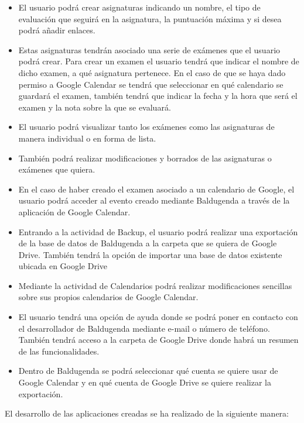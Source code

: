 \begin{itemize}
	\item El usuario podrá crear asignaturas indicando un nombre, el tipo de evaluación que seguirá en la asignatura, la puntuación máxima  y si desea podrá añadir enlaces.
	\item Estas asignaturas tendrán asociado una serie de exámenes que el usuario podrá crear. Para crear un examen el usuario tendrá que indicar el nombre de dicho examen, a qué asignatura pertenece. En el caso de que se haya dado permiso a Google Calendar se tendrá que seleccionar en qué calendario se guardará el examen, también tendrá que indicar la fecha y la hora que será el examen y la nota sobre la que se evaluará.
	\item El usuario podrá visualizar tanto los exámenes como las asignaturas de manera individual o en forma de lista.
	\item También podrá realizar modificaciones y borrados de las asignaturas o exámenes que quiera.
	\item En el caso de haber creado el examen asociado a un calendario de Google, el usuario podrá acceder al evento creado mediante Baldugenda a través de la aplicación de Google Calendar.
	\item Entrando a la actividad de Backup, el usuario podrá realizar una exportación de la base de datos de Baldugenda a la carpeta que se quiera de Google Drive. También tendrá la opción de importar una base de datos existente ubicada en Google Drive
	\item Mediante la actividad de Calendarios podrá realizar modificaciones sencillas sobre sus propios calendarios de Google Calendar.
	\item El usuario tendrá una opción de ayuda donde se podrá poner en contacto con el desarrollador de Baldugenda mediante e-mail o número de teléfono. También tendrá acceso a la carpeta de Google Drive donde habrá un resumen de las funcionalidades.
	\item Dentro de Baldugenda se podrá seleccionar qué cuenta se quiere usar de Google Calendar y en qué cuenta de Google Drive se quiere realizar la exportación.
\end{itemize}

El desarrollo de las aplicaciones creadas se ha realizado de la siguiente manera:

